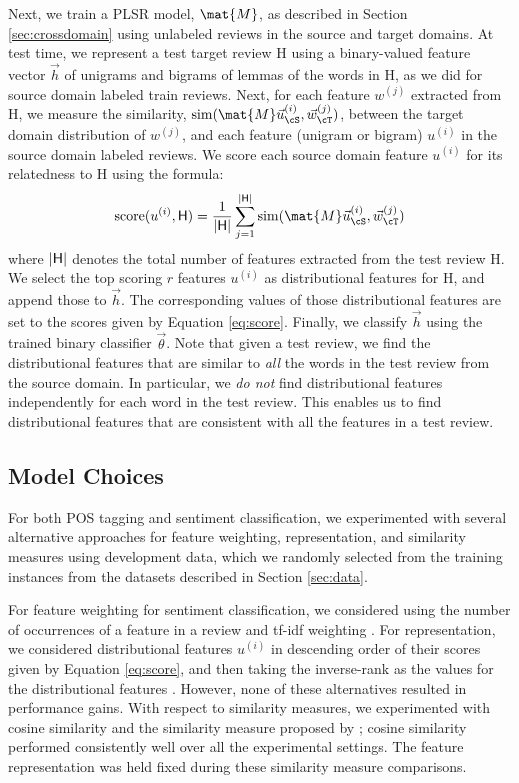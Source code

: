 \documentclass[11pt]{article}
\begin{document}
 Next, we train a PLSR model, $\mat{M}$, as described in Section \ref{sec:crossdomain} using unlabeled reviews in the
 source and target domains. At test time,  we represent a test target review \textsf{H} using a binary-valued feature vector
$\vec{h}$  of unigrams and bigrams of lemmas of the words in \textsf{H}, as we did for source domain labeled train reviews.
 Next, for each feature $w^{(j)}$ extracted from \textsf{H}, we measure the similarity, ${\rm sim}(\mat{M}\vec{u}^{(i)}_{\cS}, \vec{w}^{(j)}_{\cT})$, 
 between the target domain distribution of $w^{(j)}$,
 and each feature (unigram or bigram) $u^{(i)}$ in the source domain labeled reviews. 
 We score each source domain feature $u^{(i)}$ for its relatedness to \textsf{H} using
 the formula:
 \begin{equation}
 \label{eq:score}
 {\rm score}(u^{(i)}, {\rm \textsf{H}}) = \frac{1}{|{\rm \textsf{H}}|} \sum_{j=1}^{|{\rm \textsf{H}}|} {\rm sim}(\mat{M}\vec{u}^{(i)}_{\cS}, \vec{w}^{(j)}_{\cT}) 
 \end{equation}
 where ${|{\rm \textsf{H}}|}$ denotes the total number of features extracted from the test review \textsf{H}. 
 We select the top scoring $r$ features $u^{(i)}$ as distributional features for 
 \textsf{H}, and append those to $\vec{h}$.
 The corresponding values of those distributional features are set to the scores given by Equation \ref{eq:score}. 
 Finally, we classify $\vec{h}$ using the trained binary classifier $\vec{\theta}$. 
 Note that given a test review, we find the distributional features that are similar to \textit{all}
the words in the test review from the source domain. In particular, we \textit{do not} find distributional features
independently for each word in the test review. This enables us to find distributional features that are
consistent with all the features in a test review.

\subsection{Model Choices}
\label{sec:para}

For both POS tagging and sentiment classification, we experimented with several alternative approaches for feature weighting, 
representation, and similarity measures using development data, which we randomly selected from the
training instances from the datasets described in Section \ref{sec:data}.

For feature weighting for sentiment classification, we considered using the number of occurrences of a feature in a review
and tf-idf weighting \cite{IR_book}. For representation, we considered distributional features $u^{(i)}$ in descending 
order of their scores given by Equation \ref{eq:score}, and then taking the inverse-rank as the values for
the distributional features \cite{Bollegala:ACL:2011}.
However, none of these alternatives resulted in performance gains.
With respect to similarity measures, we experimented with cosine similarity and 
the similarity measure proposed by ; cosine similarity performed
consistently well over all the experimental settings.
The feature representation was held fixed during these similarity measure comparisons. 
\end{document}
